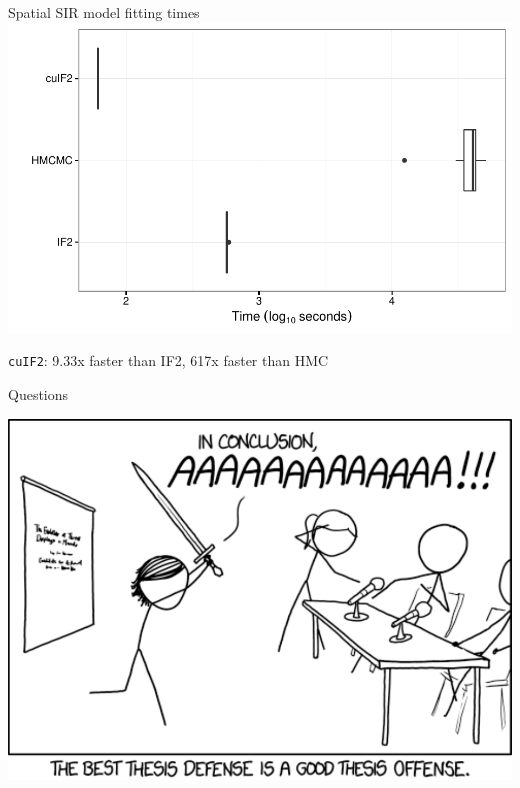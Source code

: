 \documentclass[12pt]{beamer}
\begin{document}
\begin{frame}

	\null
	\large
	Spatial SIR model fitting times \\
	\vspace{\baselineskip}
	\includegraphics[width=\textwidth,height=\textheight,keepaspectratio=true]{../../writing/SPATIAL/images/timeplot2}

	\centering
	\vspace{0.5\baselineskip}
	\footnotesize
	\texttt{cuIF2}: 9.33x faster than IF2, 617x faster than HMC

\end{frame}


\begin{frame}
	
	\null
	\vspace{\baselineskip}
	\centering
	\huge
	Questions

\end{frame}

\begin{frame}
	\nocite{*}
	
	
\end{frame}


\begin{frame}

	\null
	\includegraphics[width=\textwidth,height=\textheight,keepaspectratio=true]{images/thesis_defense}

\end{frame}
\end{document}
